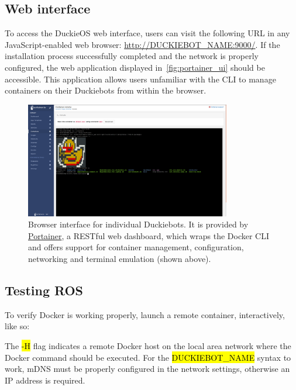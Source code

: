 \documentclass[12pt,initial,twoside,maitrise]{dms}
\newcommand{\inline}[1]{%
    \begingroup%
    \sethlcolor{slightgray}%
    \hl{\ttfamily\small #1}%
    \endgroup
}
\numberwithin{equation}{section}
\numberwithin{table}{chapter}
\numberwithin{figure}{chapter}
\begin{document}
\subsection{Web interface}

To access the DuckieOS web interface, users can visit the following URL in any JavaScript-enabled web browser: \url{http://DUCKIEBOT_NAME:9000/}. If the installation process successfully completed and the network is properly configured, the web application displayed in~\autoref{fig:portainer_ui} should be accessible. This application allows users unfamiliar with the CLI to manage containers on their Duckiebots from within the browser.

\begin{figure}
    \includegraphics[width=0.80\textwidth]{../figures/portainer_screenshot.png}
    \caption{Browser interface for individual Duckiebots. It is provided by \href{https://www.portainer.io/}{Portainer}, a RESTful web dashboard, which wraps the Docker CLI and offers support for container management, configuration, networking and terminal emulation (shown above). }
    \label{fig:portainer_ui}
\end{figure}

\subsection{Testing ROS}

\noindent To verify Docker is working properly, launch a remote container, interactively, like so:

%
The \inline{-H} flag indicates a remote Docker host on the local area network where the Docker command should be executed. For the \inline{DUCKIEBOT\_NAME} syntax to work, mDNS must be properly configured in the network settings, otherwise an IP address is required.
\end{document}
